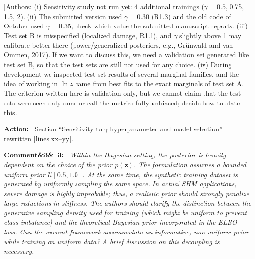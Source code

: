\documentclass[11pt]{article}
\newenvironment{rcomment}[1]{\par\bigskip\noindent\textbf{Comment\ifx&#1&\else\ #1\fi:}\ \itshape}{\par}
\newenvironment{action}{\par\smallskip\noindent\color{resp}\textbf{Action:}\ }{\par}
\newcommand{\authornote}[1]{\textcolor{note}{\textsf{[Authors: #1]}}}
\newcommand{\tbd}[1]{\textcolor{note}{\textsf{[#1]}}}
\newcommand{\lines}[1]{\tbd{lines #1}}
\newcommand{\z}{\mathbf{z}}
\begin{document}
\authornote{(i) Sensitivity study not run yet: 4 additional trainings ($\gamma=0.5$, 0.75, 1.5, 2). (ii) The submitted
version used $\gamma=0.30$ (R1.3) and the old code of October used $\gamma=0.35$; check which value the submitted manuscript
reports. (iii) Test set B is misspecified (localized damage, R1.1), and $\gamma$ slightly above 1 may calibrate better
there (power/generalized posteriors, e.g., Gr\"unwald and van Ommen, 2017). If we want to discuss this, we need a
validation set generated like test set B, so that the test sets are still not used for any choice. (iv) During
development we inspected test-set results of several marginal families, and the idea of working in $\ln z$ came from best
fits to the exact marginals of test set A. The criterion written here is validation-only, but we cannot claim that the
test sets were seen only once or call the metrics fully unbiased; decide how to state this.}

\begin{action}
Section ``Sensitivity to $\gamma$ hyperparameter and model selection'' rewritten \lines{xx--yy}.
\end{action}

\begin{rcomment}{3}
Within the Bayesian setting, the posterior is heavily dependent on the choice of the prior $p(\z)$. The formulation
assumes a bounded uniform prior $\mathcal{U}[0.5,1.0]$. At the same time, the synthetic training dataset is generated
by uniformly sampling the same space. In actual SHM applications, severe damage is highly improbable; thus, a realistic
prior should strongly penalize large reductions in stiffness. The authors should clarify the distinction between the
generative sampling density used for training (which might be uniform to prevent class imbalance) and the theoretical
Bayesian prior incorporated in the ELBO loss. Can the current framework accommodate an informative, non-uniform prior
while training on uniform data? A brief discussion on this decoupling is necessary.
\end{rcomment}
\end{document}
